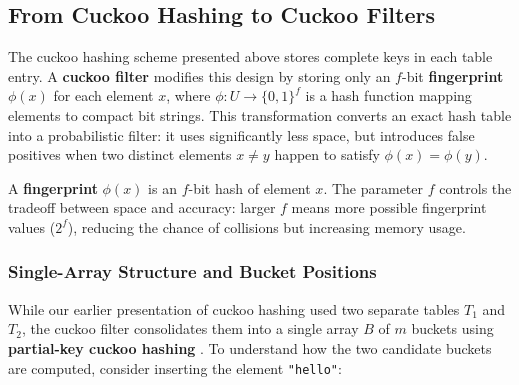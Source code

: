 \subsection{From Cuckoo Hashing to Cuckoo Filters}

The cuckoo hashing scheme presented above stores complete keys in each 
table entry. A \textbf{cuckoo filter} \cite{cuckoo} modifies this design 
by storing only an $f$-bit \textbf{fingerprint} $\phi(x)$ for each 
element $x$, where $\phi : U \to \{0,1\}^f$ is a hash function mapping 
elements to compact bit strings. This transformation converts an exact 
hash table into a probabilistic filter: it uses significantly less space, 
but introduces false positives when two distinct elements $x \neq y$ 
happen to satisfy $\phi(x) = \phi(y)$.

\begin{definitionbox}[Fingerprint]
A \textbf{fingerprint} $\phi(x)$ is an $f$-bit hash of element $x$. 
The parameter $f$ controls the tradeoff between space and accuracy: 
larger $f$ means more possible fingerprint values ($2^f$), reducing the 
chance of collisions but increasing memory usage.
\end{definitionbox}

\subsubsection{Single-Array Structure and Bucket Positions}

While our earlier presentation of cuckoo hashing used two separate 
tables $T_1$ and $T_2$, the cuckoo filter consolidates them into a 
single array $B$ of $m$ buckets using \textbf{partial-key cuckoo hashing} 
\cite{cuckoo}. To understand how the two candidate buckets are computed, 
consider inserting the element \texttt{"hello"}:

